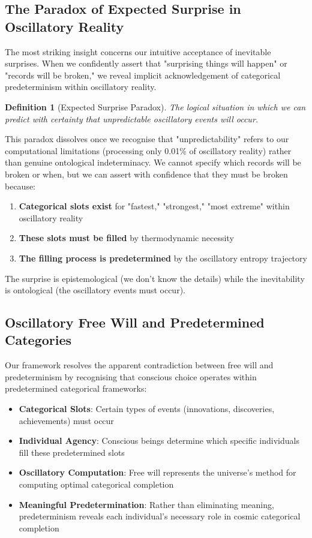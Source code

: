 \documentclass[11pt]{article}
\newtheorem{definition}[theorem]{Definition}
\theoremstyle{remark}
\begin{document}
\subsection{The Paradox of Expected Surprise in Oscillatory Reality}

The most striking insight concerns our intuitive acceptance of inevitable surprises. When we confidently assert that "surprising things will happen" or "records will be broken," we reveal implicit acknowledgement of categorical predeterminism within oscillatory reality.

\begin{definition}[Expected Surprise Paradox]
The logical situation in which we can predict with certainty that unpredictable oscillatory events will occur.
\end{definition}

This paradox dissolves once we recognise that "unpredictability" refers to our computational limitations (processing only 0.01\% of oscillatory reality) rather than genuine ontological indeterminacy. We cannot specify which records will be broken or when, but we can assert with confidence that they must be broken because:

\begin{enumerate}
\item \textbf{Categorical slots exist} for "fastest," "strongest," "most extreme" within oscillatory reality
\item \textbf{These slots must be filled} by thermodynamic necessity
\item \textbf{The filling process is predetermined} by the oscillatory entropy trajectory
\end{enumerate}

The surprise is epistemological (we don't know the details) while the inevitability is ontological (the oscillatory events must occur).

\subsection{Oscillatory Free Will and Predetermined Categories}

Our framework resolves the apparent contradiction between free will and predeterminism by recognising that conscious choice operates within predetermined categorical frameworks:

\begin{itemize}
\item \textbf{Categorical Slots}: Certain types of events (innovations, discoveries, achievements) must occur
\item \textbf{Individual Agency}: Conscious beings determine which specific individuals fill these predetermined slots
\item \textbf{Oscillatory Computation}: Free will represents the universe's method for computing optimal categorical completion
\item \textbf{Meaningful Predetermination}: Rather than eliminating meaning, predeterminism reveals each individual's necessary role in cosmic categorical completion
\end{itemize}
\end{document}
